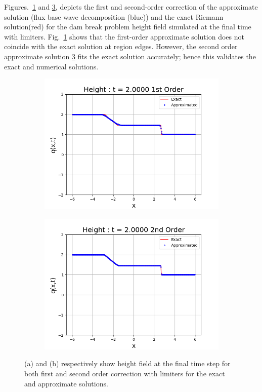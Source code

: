 \documentclass[11pt,a4paper]{article}
\newcommand{\donna}[1]{{\color{red}{#1}}}
\begin{document}
Figures.~\ref{fig:exap} and \ref{fig:exapp}, depicts the first and second-order correction of the approximate solution (flux base wave decomposition (blue)) \cite{ba-le-mi-ro:2003} and the exact Riemann solution(red) for the dam break problem height field simulated at the final time with limiters. Fig.~\ref{fig:exap}  shows that the first-order approximate solution does not coincide with the exact solution at region edges. However, the second order approximate solution \ref{fig:exapp}  fits the exact solution accurately; hence this validates the exact and numerical solutions.
	\begin{figure}[H]
		\begin{subfigure}[b]{0.5\textwidth}
			\centering
			\includegraphics[width=1.0\linewidth]{images/exap}
			\caption{}
			\label{fig:exap}
		\end{subfigure}
		\begin{subfigure}[b]{0.5\textwidth}
			\centering
			\includegraphics[width=1.0\linewidth]{images/exapp}
			\caption{}
			\label{fig:exapp}
		\end{subfigure}
		\caption{(a) and (b) respectively show height field at the final time step for both first and second order correction with limiters for the exact and approximate solutions. }
	\end{figure}
	\donna{Remove excess white space in figures below y=0.}
\end{document}
